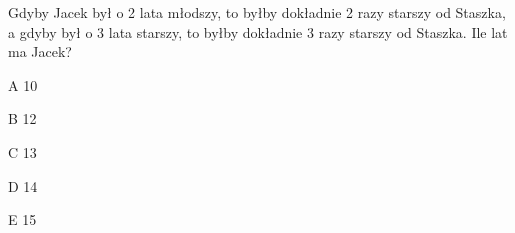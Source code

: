 \begin{tresc}
Gdyby Jacek był o 2 lata młodszy, to byłby dokładnie 2 razy starszy od Staszka, a gdyby był o 3 lata starszy, to byłby dokładnie 3 razy starszy od Staszka. Ile lat ma Jacek?
\end{tresc}
\begin{wariant}{A} 10 \end{wariant}
\begin{wariant}{B} 12 \end{wariant}
\begin{wariant}{C} 13 \end{wariant}
\begin{wariant}{D} 14 \end{wariant}
\begin{wariant}{E} 15 \end{wariant}
